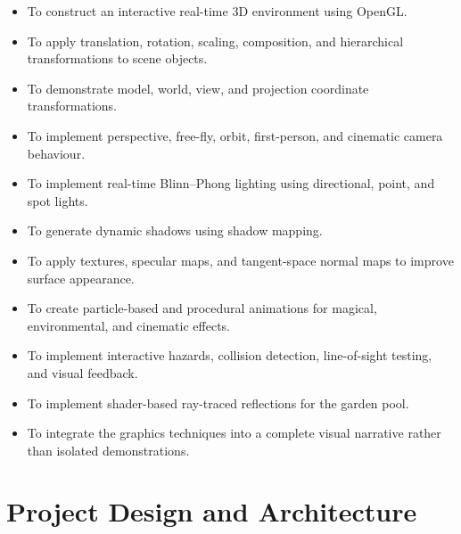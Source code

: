 \documentclass[11pt,a4paper]{article}
\begin{document}
\begin{itemize}

    \item To construct an interactive real-time 3D environment using OpenGL.

    \item To apply translation, rotation, scaling, composition, and
    hierarchical transformations to scene objects.

    \item To demonstrate model, world, view, and projection coordinate
    transformations.

    \item To implement perspective, free-fly, orbit, first-person, and
    cinematic camera behaviour.

    \item To implement real-time Blinn--Phong lighting using directional,
    point, and spot lights.

    \item To generate dynamic shadows using shadow mapping.

    \item To apply textures, specular maps, and tangent-space normal maps to
    improve surface appearance.

    \item To create particle-based and procedural animations for magical,
    environmental, and cinematic effects.

    \item To implement interactive hazards, collision detection,
    line-of-sight testing, and visual feedback.

    \item To implement shader-based ray-traced reflections for the garden pool.

    \item To integrate the graphics techniques into a complete visual
    narrative rather than isolated demonstrations.

\end{itemize}



\section{Project Design and Architecture}
\end{document}
